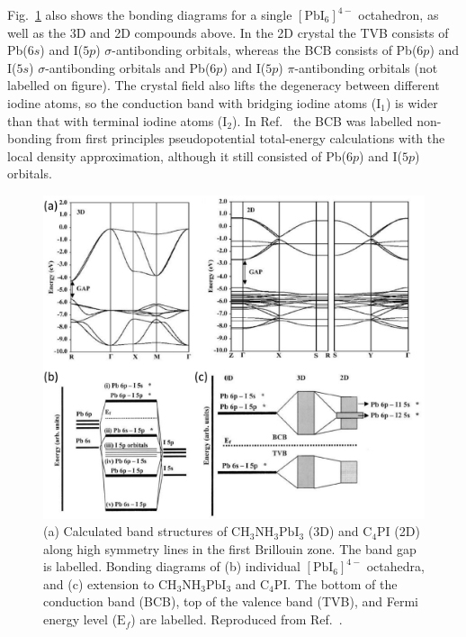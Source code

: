 Fig.\ \ref{2Fig12} also shows the bonding diagrams for a single $[\textrm{PbI}_6]^{4-}$ octahedron, as well as the 3D and 2D compounds above. In the 2D crystal the TVB consists of Pb($6s$) and I($5p$) $\sigma$-antibonding orbitals, whereas the BCB consists of Pb($6p$) and I($5s$) $\sigma$-antibonding orbitals and Pb($6p$) and I($5p$) $\pi$-antibonding orbitals (not labelled on figure). The crystal field also lifts the degeneracy between different iodine atoms, so the conduction band with bridging iodine atoms ($\textrm{I}_1$) is wider than that with terminal iodine atoms ($\textrm{I}_2$). In Ref.\ \cite{Matsuishi2004} the BCB was labelled non-bonding from first principles pseudopotential total-energy calculations with the local density approximation, although it still consisted of Pb($6p$) and I($5p$) orbitals.
\begin{figure}[h]
\centering
\includegraphics[width=\textwidth]{Fig12}
\caption{(a) Calculated band structures of $\textrm{CH}_3\textrm{NH}_3\textrm{PbI}_3$ (3D) and $\textrm{C}_{4}$PI (2D) along high symmetry lines in the first Brillouin zone. The band gap is labelled. Bonding diagrams of (b) individual $[\textrm{PbI}_6]^{4-}$ octahedra, and (c) extension to $\textrm{CH}_3\textrm{NH}_3\textrm{PbI}_3$ and $\textrm{C}_{4}$PI. The bottom of the conduction band (BCB), top of the valence band (TVB), and Fermi energy level ($\textrm{E}_f$) are labelled. Reproduced from Ref.\ \cite{Umebayashi2003}.}
\label{2Fig12}
\end{figure}



